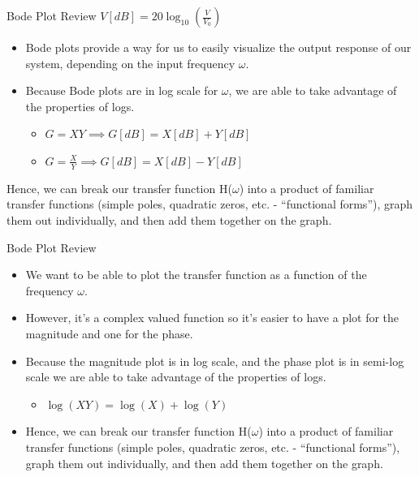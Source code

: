\documentclass{beamer}
\begin{document}
    \begin{frame}{Bode Plot Review}
        $V[dB] = 20\log_{10}(\frac{V}{V_0})$
        \begin{itemize}
            \item Bode plots provide a way for us to easily visualize the output response of our system, depending on the input frequency $\omega$. 
            \item Because Bode plots are in log scale for $\omega$, we are able to take advantage of the properties of logs.
            \begin{itemize}
                \item $G = XY \implies G[dB] = X[dB] + Y[dB]$
                \item $G = \frac{X}{Y} \implies G[dB] = X[dB] - Y[dB]$
            \end{itemize}
        \end{itemize}
        Hence, we can break our transfer function H($\omega$) into a product of familiar transfer functions (simple poles, quadratic zeros, etc. - “functional forms”), graph them out individually, and then add them together on the graph.  
    \end{frame}
    \begin{frame}{Bode Plot Review}
        \begin{itemize}
            \item We want to be able to plot the transfer function as a function of the frequency $\omega$. 
            \item However, it’s a complex valued function so it’s easier to have a plot for the magnitude and one for the phase. 
            \item Because the magnitude plot is in log scale, and the phase plot is in semi-log scale we are able to take advantage of the properties of logs. 
            \begin{itemize}
                \item $\log(XY) = \log(X) + \log(Y)$
            \end{itemize}
            \item Hence, we can break our transfer function H($\omega$) into a product of familiar transfer functions (simple poles, quadratic zeros, etc. - “functional forms”), graph them out individually, and then add them together on the graph.
        \end{itemize}
    \end{frame}
\end{document}

